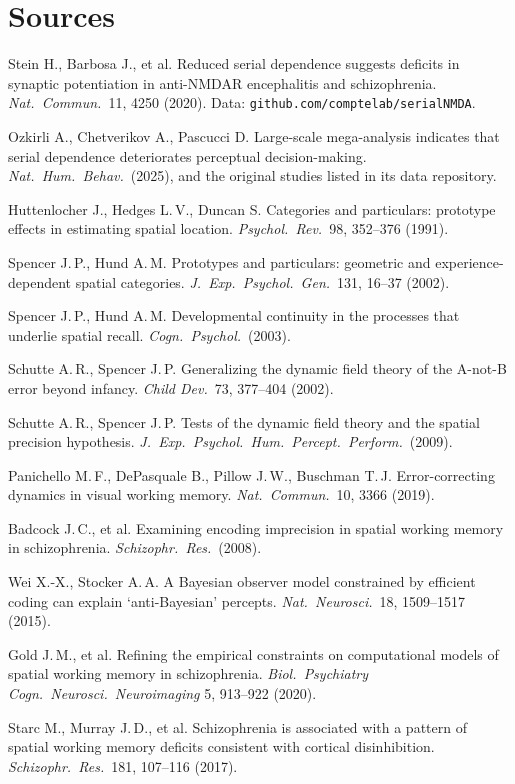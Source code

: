 \documentclass[10pt,a4paper]{article}
\begin{document}
\section*{Sources}

{\small
Stein H., Barbosa J., et al. Reduced serial dependence suggests deficits in synaptic potentiation in
anti-NMDAR encephalitis and schizophrenia. \emph{Nat.\ Commun.}\ 11, 4250 (2020). Data:
\texttt{github.com/comptelab/serialNMDA}.

Ozkirli A., Chetverikov A., Pascucci D. Large-scale mega-analysis indicates that serial dependence
deteriorates perceptual decision-making. \emph{Nat.\ Hum.\ Behav.}\ (2025), and the original studies listed
in its data repository.

Huttenlocher J., Hedges L.\,V., Duncan S. Categories and particulars: prototype effects in estimating spatial
location. \emph{Psychol.\ Rev.}\ 98, 352--376 (1991).

Spencer J.\,P., Hund A.\,M. Prototypes and particulars: geometric and experience-dependent spatial categories.
\emph{J.\ Exp.\ Psychol.\ Gen.}\ 131, 16--37 (2002).

Spencer J.\,P., Hund A.\,M. Developmental continuity in the processes that underlie spatial recall.
\emph{Cogn.\ Psychol.}\ (2003).

Schutte A.\,R., Spencer J.\,P. Generalizing the dynamic field theory of the A-not-B error beyond infancy.
\emph{Child Dev.}\ 73, 377--404 (2002).

Schutte A.\,R., Spencer J.\,P. Tests of the dynamic field theory and the spatial precision hypothesis.
\emph{J.\ Exp.\ Psychol.\ Hum.\ Percept.\ Perform.}\ (2009).

Panichello M.\,F., DePasquale B., Pillow J.\,W., Buschman T.\,J. Error-correcting dynamics in visual working
memory. \emph{Nat.\ Commun.}\ 10, 3366 (2019).

Badcock J.\,C., et al. Examining encoding imprecision in spatial working memory in schizophrenia.
\emph{Schizophr.\ Res.}\ (2008).

Wei X.-X., Stocker A.\,A. A Bayesian observer model constrained by efficient coding can explain
`anti-Bayesian' percepts. \emph{Nat.\ Neurosci.}\ 18, 1509--1517 (2015).

Gold J.\,M., et al. Refining the empirical constraints on computational models of spatial working memory in
schizophrenia. \emph{Biol.\ Psychiatry Cogn.\ Neurosci.\ Neuroimaging} 5, 913--922 (2020).

Starc M., Murray J.\,D., et al. Schizophrenia is associated with a pattern of spatial working memory deficits
consistent with cortical disinhibition. \emph{Schizophr.\ Res.}\ 181, 107--116 (2017).
}
\end{document}

